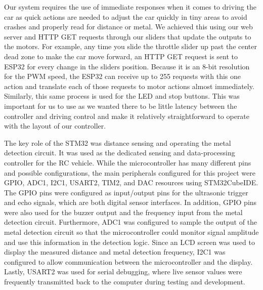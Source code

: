 \documentclass[11pt]{article}
\begin{document}
Our system requires the use of immediate responses when it comes to driving the car as quick actions are needed to adjust the car quickly in tiny areas to avoid crashes and properly read for distance or metal. We achieved this using our web server and HTTP GET requests through our sliders that update the outputs to the motors. For example, any time you slide the throttle slider up past the center dead zone to make the car move forward, an HTTP GET request is sent to ESP32 for every change in the sliders position. Because it is an 8-bit resolution for the PWM speed, the ESP32 can receive up to 255 requests with this one action and translate each of those requests to motor actions almost immediately. Similarly, this same process is used for the LED and stop buttons. This was important for us to use as we wanted there to be little latency between the controller and driving control and make it relatively straightforward to operate with the layout of our controller. 

The key role of the STM32 was distance sensing and operating the metal detection circuit. It was used as the dedicated sensing and data-processing controller for the RC vehicle. While the microcontroller has many different pins and possible configurations, the main peripherals configured for this project were GPIO, ADC1, I2C1, USART2, TIM2, and DAC resources using STM32CubeIDE. The GPIO pins were configured as input/output pins for the ultrasonic trigger and echo signals, which are both digital sensor interfaces. In addition, GPIO pins were also used for the buzzer output and the frequency input from the metal detection circuit. Furthermore, ADC1 was configured to sample the output of the metal detection circuit so that the microcontroller could monitor signal amplitude and use this information in the detection logic. Since an LCD screen was used to display the measured distance and metal detection frequency, I2C1 was configured to allow communication between the microcontroller and the display. Lastly, USART2 was used for serial debugging, where live sensor values were frequently transmitted back to the computer during testing and development.
\end{document}
